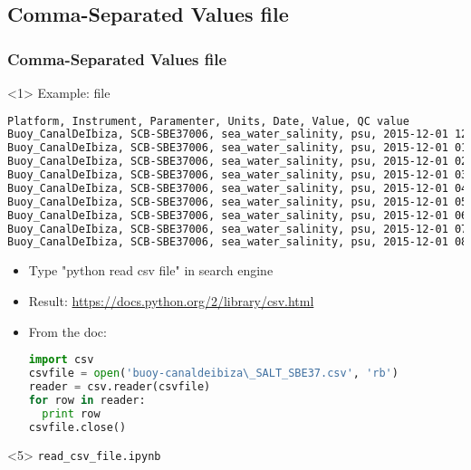 \subsection{Comma-Separated Values file}
\begin{frame}[fragile]
\frametitle{Comma-Separated Values file}

\begin{onlyenv}<1>
Example: file 

\begin{lstlisting}[language=bash,basicstyle=\tiny,title={Example of CSV file}]
Platform, Instrument, Paramenter, Units, Date, Value, QC value 
Buoy_CanalDeIbiza, SCB-SBE37006, sea_water_salinity, psu, 2015-12-01 12:00:00, 36.916, 1.0
Buoy_CanalDeIbiza, SCB-SBE37006, sea_water_salinity, psu, 2015-12-01 01:00:00, 36.936, 1.0
Buoy_CanalDeIbiza, SCB-SBE37006, sea_water_salinity, psu, 2015-12-01 02:00:00, 36.929, 1.0
Buoy_CanalDeIbiza, SCB-SBE37006, sea_water_salinity, psu, 2015-12-01 03:00:00, 36.927, 1.0
Buoy_CanalDeIbiza, SCB-SBE37006, sea_water_salinity, psu, 2015-12-01 04:00:00, 36.925, 1.0
Buoy_CanalDeIbiza, SCB-SBE37006, sea_water_salinity, psu, 2015-12-01 05:00:00, 36.948, 1.0
Buoy_CanalDeIbiza, SCB-SBE37006, sea_water_salinity, psu, 2015-12-01 06:00:00, 36.95, 1.0
Buoy_CanalDeIbiza, SCB-SBE37006, sea_water_salinity, psu, 2015-12-01 07:00:00, 36.954, 1.0
Buoy_CanalDeIbiza, SCB-SBE37006, sea_water_salinity, psu, 2015-12-01 08:00:00, 36.933, 1.0
\end{lstlisting}
\end{onlyenv}

\begin{itemize}
\item<2-> Type "python read csv file" in search engine
\item<3-> Result: \url{https://docs.python.org/2/library/csv.html}\\
\item<4-> From the doc:
\begin{lstlisting}[language=python,basicstyle=\tiny]
import csv
csvfile = open('buoy-canaldeibiza\_SALT_SBE37.csv', 'rb')
reader = csv.reader(csvfile)
for row in reader:
  print row
csvfile.close()
\end{lstlisting}
\end{itemize}

\vfill

\begin{onlyenv}<5>
\notebook \verb|read_csv_file.ipynb|
\end{onlyenv}
\end{frame}

